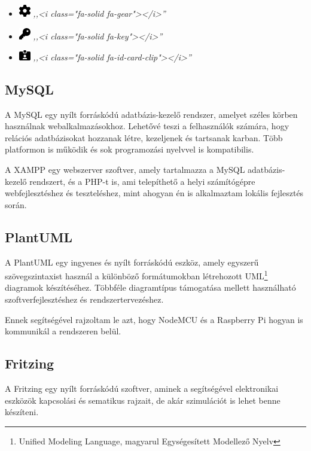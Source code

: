 \documentclass[
]{thesis-ekf}
\theoremstyle{definition}
\theoremstyle{remark}
\begin{document}
\begin{itemize}
		\item \includegraphics[width=0.5cm]{./src/icons/gear-solid}
			\emph{,,<i class="fa-solid fa-gear"></i>''}
			
		\item \includegraphics[width=0.5cm]{./src/icons/key-solid}
			\emph{,,<i class="fa-solid fa-key"></i>''}
			
		\item \includegraphics[width=0.5cm]{./src/icons/id-card-clip-solid}
			\emph{,,<i class="fa-solid fa-id-card-clip"></i>''}
			
	\end{itemize}
	\subsection{MySQL}
	A MySQL egy nyílt forráskódú adatbázis-kezelő rendszer, amelyet széles körben használnak webalkalmazásokhoz. Lehetővé teszi a felhasználók számára, hogy relációs adatbázisokat hozzanak létre, kezeljenek és tartsanak karban. Több platformon is működik és sok programozási nyelvvel is kompatibilis.
	
	A XAMPP egy webszerver szoftver, amely tartalmazza a MySQL adatbázis-kezelő rendszert, és a PHP-t is, ami telepíthető a helyi számítógépre webfejlesztéshez és teszteléshez, mint ahogyan én is alkalmaztam lokális fejlesztés során.
	\subsection{PlantUML}
	A PlantUML egy ingyenes és nyílt forráskódú eszköz, amely egyszerű szövegszintaxist használ a különböző formátumokban létrehozott UML\footnote{Unified Modeling Language, magyarul Egységesített Modellező Nyelv} diagramok készítéséhez. Többféle diagramtípus támogatása mellett használható szoftverfejlesztéshez és rendszertervezéshez.

	Ennek segítségével rajzoltam le azt, hogy NodeMCU és a Raspberry Pi hogyan is kommunikál a rendszeren belül.
	\subsection{Fritzing}
	A Fritzing egy nyílt forráskódú szoftver, aminek a segítségével elektronikai eszközök kapcsolási és sematikus rajzait, de akár szimulációt is lehet benne készíteni.
	
\end{document}
